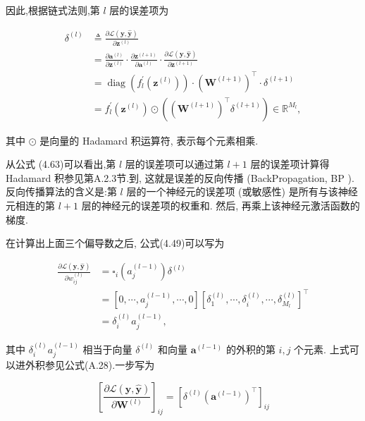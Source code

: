 \documentclass[10pt]{article}
\begin{document}
因此,根据链式法则,第 $l$ 层的误差项为


\begin{align*}
\delta^{(l)} & \triangleq \frac{\partial \mathcal{L}(\boldsymbol{y}, \hat{\boldsymbol{y}})}{\partial \boldsymbol{z}^{(l)}}  \tag{4.60}\\
& =\frac{\partial \boldsymbol{a}^{(l)}}{\partial \boldsymbol{z}^{(l)}} \cdot \frac{\partial \boldsymbol{z}^{(l+1)}}{\partial \boldsymbol{a}^{(l)}} \cdot \frac{\partial \mathcal{L}(\boldsymbol{y}, \hat{\boldsymbol{y}})}{\partial \boldsymbol{z}^{(l+1)}}  \tag{4.61}\\
& =\operatorname{diag}\left(f_{l}^{\prime}\left(\boldsymbol{z}^{(l)}\right)\right) \cdot\left(\boldsymbol{W}^{(l+1)}\right)^{\top} \cdot \delta^{(l+1)}  \tag{4.62}\\
& =f_{l}^{\prime}\left(\boldsymbol{z}^{(l)}\right) \odot\left(\left(\boldsymbol{W}^{(l+1)}\right)^{\top} \delta^{(l+1)}\right) \in \mathbb{R}^{M_{l}}, \tag{4.63}
\end{align*}


其中 $\odot$ 是向量的 Hadamard 积运算符, 表示每个元素相乘.

从公式 (4.63)可以看出,第 $l$ 层的误差项可以通过第 $l+1$ 层的误差项计算得 Hadamard 积参见第A.2.3节.到, 这就是误差的反向传播 (BackPropagation, BP ). 反向传播算法的含义是:第 $l$ 层的一个神经元的误差项 (或敏感性) 是所有与该神经元相连的第 $l+1$ 层的神经元的误差项的权重和. 然后, 再乘上该神经元激活函数的梯度.

在计算出上面三个偏导数之后, 公式(4.49)可以写为


\begin{align*}
\frac{\partial \mathcal{L}(\boldsymbol{y}, \hat{\boldsymbol{y}})}{\partial w_{i j}^{(l)}} & =\square_{i}\left(a_{j}^{(l-1)}\right) \delta^{(l)}  \tag{4.64}\\
& =\left[0, \cdots, a_{j}^{(l-1)}, \cdots, 0\right]\left[\delta_{1}^{(l)}, \cdots, \delta_{i}^{(l)}, \cdots, \delta_{M_{l}}^{(l)}\right]^{\top}  \tag{4.65}\\
& =\delta_{i}^{(l)} a_{j}^{(l-1)}, \tag{4.66}
\end{align*}


其中 $\delta_{i}^{(l)} a_{j}^{(l-1)}$ 相当于向量 $\delta^{(l)}$ 和向量 $\boldsymbol{a}^{(l-1)}$ 的外积的第 $i, j$ 个元素. 上式可以进外积参见公式(A.28).一步写为


\begin{equation*}
\left[\frac{\partial \mathcal{L}(\boldsymbol{y}, \hat{\boldsymbol{y}})}{\partial \boldsymbol{W}^{(l)}}\right]_{i j}=\left[\delta^{(l)}\left(\boldsymbol{a}^{(l-1)}\right)^{\top}\right]_{i j} \tag{4.67}
\end{equation*}
\end{document}
